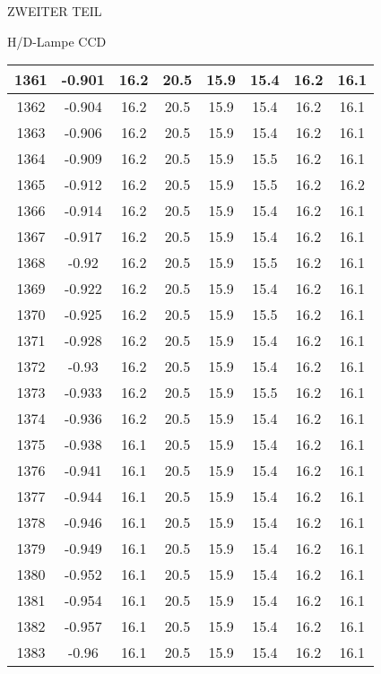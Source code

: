 \begin{appendix}
\begin{chapter}{ZWEITER TEIL}
\begin{section}{H/D-Lampe CCD}
\begin{scriptsize}
\begin{longtable}[htbp]{|c|c|c|c|c|c|c|c|}
            1361 & -0.901 & 16.2 & 20.5 & 15.9 & 15.4 & 16.2 & 16.1 \\ \hline
            1362 & -0.904 & 16.2 & 20.5 & 15.9 & 15.4 & 16.2 & 16.1 \\ \hline
            1363 & -0.906 & 16.2 & 20.5 & 15.9 & 15.4 & 16.2 & 16.1 \\ \hline
            1364 & -0.909 & 16.2 & 20.5 & 15.9 & 15.5 & 16.2 & 16.1 \\ \hline
            1365 & -0.912 & 16.2 & 20.5 & 15.9 & 15.5 & 16.2 & 16.2 \\ \hline
            1366 & -0.914 & 16.2 & 20.5 & 15.9 & 15.4 & 16.2 & 16.1 \\ \hline
            1367 & -0.917 & 16.2 & 20.5 & 15.9 & 15.4 & 16.2 & 16.1 \\ \hline
            1368 & -0.92 & 16.2 & 20.5 & 15.9 & 15.5 & 16.2 & 16.1 \\ \hline
            1369 & -0.922 & 16.2 & 20.5 & 15.9 & 15.4 & 16.2 & 16.1 \\ \hline
            1370 & -0.925 & 16.2 & 20.5 & 15.9 & 15.5 & 16.2 & 16.1 \\ \hline
            1371 & -0.928 & 16.2 & 20.5 & 15.9 & 15.4 & 16.2 & 16.1 \\ \hline
            1372 & -0.93 & 16.2 & 20.5 & 15.9 & 15.4 & 16.2 & 16.1 \\ \hline
            1373 & -0.933 & 16.2 & 20.5 & 15.9 & 15.5 & 16.2 & 16.1 \\ \hline
            1374 & -0.936 & 16.2 & 20.5 & 15.9 & 15.4 & 16.2 & 16.1 \\ \hline
            1375 & -0.938 & 16.1 & 20.5 & 15.9 & 15.4 & 16.2 & 16.1 \\ \hline
            1376 & -0.941 & 16.1 & 20.5 & 15.9 & 15.4 & 16.2 & 16.1 \\ \hline
            1377 & -0.944 & 16.1 & 20.5 & 15.9 & 15.4 & 16.2 & 16.1 \\ \hline
            1378 & -0.946 & 16.1 & 20.5 & 15.9 & 15.4 & 16.2 & 16.1 \\ \hline
            1379 & -0.949 & 16.1 & 20.5 & 15.9 & 15.4 & 16.2 & 16.1 \\ \hline
            1380 & -0.952 & 16.1 & 20.5 & 15.9 & 15.4 & 16.2 & 16.1 \\ \hline
            1381 & -0.954 & 16.1 & 20.5 & 15.9 & 15.4 & 16.2 & 16.1 \\ \hline
            1382 & -0.957 & 16.1 & 20.5 & 15.9 & 15.4 & 16.2 & 16.1 \\ \hline
            1383 & -0.96 & 16.1 & 20.5 & 15.9 & 15.4 & 16.2 & 16.1 \\ \hline

\end{longtable}
\end{scriptsize}
\end{section}
\end{chapter}
\end{appendix}
